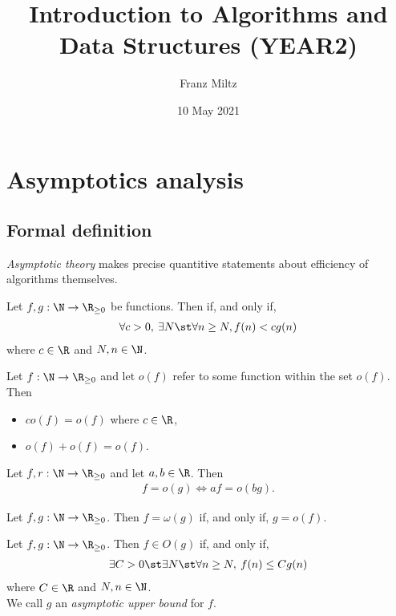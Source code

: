 \documentclass{article}
\begin{document}
\title{Introduction to Algorithms and Data Structures (YEAR2)}
\author{Franz Miltz}
\date{10 May 2021}
\maketitle
\setcounter{tocdepth}{2}
\tableofcontents
\pagebreak


\section{Asymptotics analysis}

\subsection{Formal definition}

\emph{Asymptotic theory} makes precise quantitive statements about efficiency of algorithms themselves.
\begin{definition}
	Let $f,g:\N\to\R_{\geq 0}$ be functions. Then
	 if, and only if,
	\begin{align*}
		\forall c>0,\:\exists N\st \forall n \geq N, f(n)<cg(n)
	\end{align*}
	where $c\in\R$ and $N,n\in\N$.
\end{definition}
\begin{theorem}
	Let $f:\N\to\R_{\geq 0}$ and let $o(f)$ refer to some
	function within the set $o(f)$. Then
	\begin{itemize}
		\item $co(f)=o(f)$ where $c\in\R$,
		\item $o(f) + o(f) = o(f)$.
	\end{itemize}
\end{theorem}
\begin{theorem}
	Let $f,r:\N\to\R_{\geq 0}$ and let $a,b\in\R$. Then
	\begin{align*}
		f=o(g) \Leftrightarrow af=o(bg).
	\end{align*}
\end{theorem}
\begin{definition}
	Let $f,g:\N\to\R_{\geq 0}$. Then $f=\omega(g)$ if, and only if, $g=o(f)$.
\end{definition}
\begin{definition}
	Let $f,g:\N\to\R_{\geq 0}$. Then $f\in O(g)$ if, and only if,
	\begin{align*}
		\exists C > 0\st \exists N \st \forall n \geq N,\: f(n) \leq Cg(n)
	\end{align*}
	where $C\in\R$ and $N,n\in\N$.\\
	We call $g$ an \emph{asymptotic upper bound} for $f$.
\end{definition}
\end{document}
